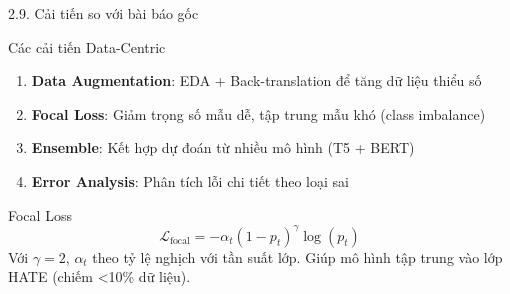 \documentclass[11pt, aspectratio=169]{beamer}
\begin{document}
\begin{frame}[shrink=5]{2.9. Cải tiến so với bài báo gốc}

\begin{block}{Các cải tiến Data-Centric}
  \begin{enumerate}
    \item \textbf{Data Augmentation}: EDA + Back-translation để tăng dữ liệu thiểu số
    \item \textbf{Focal Loss}: Giảm trọng số mẫu dễ, tập trung mẫu khó (class imbalance)
    \item \textbf{Ensemble}: Kết hợp dự đoán từ nhiều mô hình (T5 + BERT)
    \item \textbf{Error Analysis}: Phân tích lỗi chi tiết theo loại sai
  \end{enumerate}
\end{block}

\vspace{0.2cm}
\begin{block}{Focal Loss}
  \[
    \mathcal{L}_{\text{focal}} = -\alpha_t (1 - p_t)^\gamma \log(p_t)
  \]
  Với $\gamma = 2$, $\alpha_t$ theo tỷ lệ nghịch với tần suất lớp. Giúp mô hình tập trung vào lớp HATE (chiếm <10\% dữ liệu).
\end{block}
\end{frame}
\end{document}
